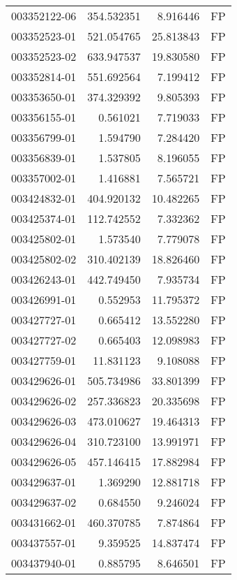 \begin{tabular}{lrrl}
003352122-06 &  354.532351 &       8.916446 &   FP \\
003352523-01 &  521.054765 &      25.813843 &   FP \\
003352523-02 &  633.947537 &      19.830580 &   FP \\
003352814-01 &  551.692564 &       7.199412 &   FP \\
003353650-01 &  374.329392 &       9.805393 &   FP \\
003356155-01 &    0.561021 &       7.719033 &   FP \\
003356799-01 &    1.594790 &       7.284420 &   FP \\
003356839-01 &    1.537805 &       8.196055 &   FP \\
003357002-01 &    1.416881 &       7.565721 &   FP \\
003424832-01 &  404.920132 &      10.482265 &   FP \\
003425374-01 &  112.742552 &       7.332362 &   FP \\
003425802-01 &    1.573540 &       7.779078 &   FP \\
003425802-02 &  310.402139 &      18.826460 &   FP \\
003426243-01 &  442.749450 &       7.935734 &   FP \\
003426991-01 &    0.552953 &      11.795372 &   FP \\
003427727-01 &    0.665412 &      13.552280 &   FP \\
003427727-02 &    0.665403 &      12.098983 &   FP \\
003427759-01 &   11.831123 &       9.108088 &   FP \\
003429626-01 &  505.734986 &      33.801399 &   FP \\
003429626-02 &  257.336823 &      20.335698 &   FP \\
003429626-03 &  473.010627 &      19.464313 &   FP \\
003429626-04 &  310.723100 &      13.991971 &   FP \\
003429626-05 &  457.146415 &      17.882984 &   FP \\
003429637-01 &    1.369290 &      12.881718 &   FP \\
003429637-02 &    0.684550 &       9.246024 &   FP \\
003431662-01 &  460.370785 &       7.874864 &   FP \\
003437557-01 &    9.359525 &      14.837474 &   FP \\
003437940-01 &    0.885795 &       8.646501 &   FP \\

\end{tabular}
